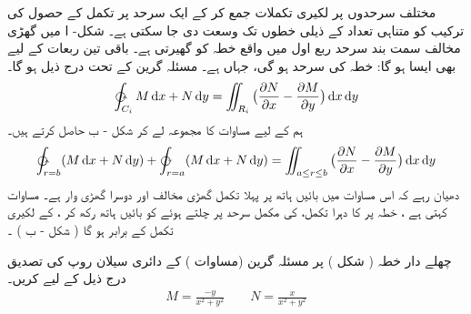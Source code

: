    مختلف سرحدوں پر لکیری تکملات  جمع کر کے ایک سرحد پر تکمل کے حصول کی ترکیب  کو متناہی تعداد کے ذیلی خطوں تک وسعت دی جا سکتی ہے۔ شکل- ا   میں    گھڑی  مخالف سمت بند سرحد      ربع اول میں واقع خطہ   کو گھیرتی ہے۔ باقی تین  ربعات کے لیے بھی ایسا ہو گا:    خطہ  کی سرحد   ہو گی، جہاں    ہے۔ مسئلہ  گرین کے تحت  درج ذیل ہو گا۔ 
\begin{align}\label{مساوات_سمتی_تکمل_چار_حصے}
     \ointctrclockwise_{C_i} M \dif x + N \dif y = \iint_{R_i} \big(\frac{\partial N}{\partial x} -  \frac{\partial M}{\partial y}\big) \dif x \dif y 
\end{align}
 ہم  کے لیے  مساوات      کا مجموعہ  لے کر شکل    - ب  حاصل کرتے ہیں۔
\begin{align}\label{مساوات_سمتی_تکمل_چار_مجموعہ}
     \ointctrclockwise_{r=b} (M \dif x + N \dif y) + \varointclockwise_{r=a} (M \dif x + N \dif y) = \iint_{a\leq r \leq b} \big(\frac{\partial N}{\partial x} -  \frac{\partial M}{\partial y}\big) \dif x \dif y 
\end{align}
دھیان رہے کہ اس   مساوات میں بائیں ہاتھ  پر پہلا تکمل گھڑی مخالف اور دوسرا گھڑی وار ہے۔
 مساوات      کہتی ہے   ،  خطہ    پر   کا دہرا  تکمل،   کی مکمل  سرحد پر چلتے ہوئے  کو  بائیں ہاتھ رکھ کر  ،  کے   لکیری تکمل   کے برابر ہو گا  ( شکل     - ب   )  ۔

 چھلے دار  خطہ  ( شکل    ) پر  مسئلہ  گرین (مساوات  ) کے  دائری سیلان روپ کی تصدیق  درج ذیل کے لیے کریں۔
\begin{align*}
  M = \frac{-y}{x^2 + y^2} \quad\quad N=\frac{x}{x^2 + y^2}  
\end{align*}

